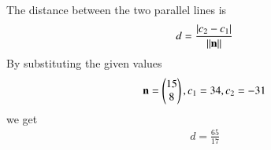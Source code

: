 
    The distance between the two parallel lines is 
    \begin{align}
    d = \frac{\left\vert c_2-c_1\right\vert}{\left\lVert\mathbf{n}\right\rVert}
    \end{align}
    By substituting the given values 
    \begin{align}
     \mathbf{n} = \begin{pmatrix}15 \\ 8\end{pmatrix}, c_1=34,c_2=-31
    \end{align}
    we get  
    \begin{align}
    d=\frac{{65}}{17}
    \end{align}


